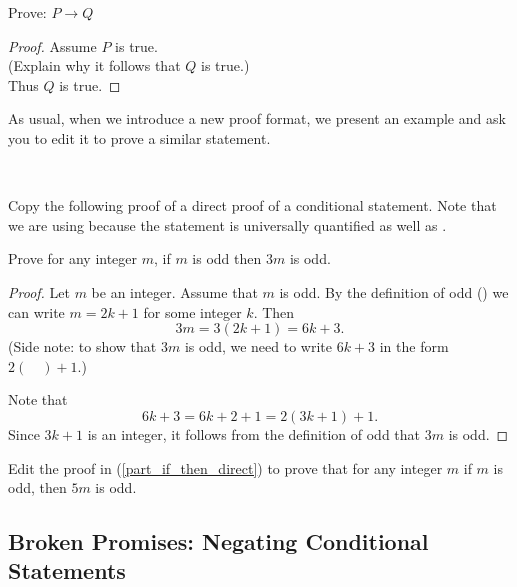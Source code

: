 \begin{pff}
\label{pff_if_then_direct} 
    Prove: $P \to Q$ 
    \begin{proof}
        Assume $P$ is true. \\
        (Explain why it follows that $Q$ is true.) \\
        Thus $Q$ is true.
    \end{proof}    
\end{pff}

As usual, when we introduce a new proof format, we present an example and ask you to edit it to prove a similar statement.

\begin{act}
\label{act_pffifthen}
~
    \begin{actpart}
        \item \label{part_if_then_direct} Copy the following proof of a direct proof of a conditional statement.  Note that we are using  because the statement is universally quantified as well as .

        Prove for any integer $m$, if $m$ is odd then $3m$ is odd.
            \begin{proof}
                Let $m$ be an integer.  Assume that $m$ is odd.  By the definition of odd () we can write $m=2k+1$ for some integer $k$.  Then     $$3m=3(2k+1)=6k+3.$$
                (Side note: to show that $3m$ is odd, we need to write $6k+3$ in the form $2(\quad)+1$.)
            
                Note that $$6k+3 = 6k+2+1 = 2(3k+1) + 1.$$
                Since $3k+1$ is an integer, it follows from the definition of odd that $3m$ is odd.
            \end{proof}

        \item Edit the proof in (\ref{part_if_then_direct}) to prove that for any integer $m$ if $m$ is odd, then $5m$ is odd.  
    \end{actpart}
\end{act}


 
\newcommand{\subnegcond}{Broken Promises: Negating Conditional Statements}
\subsection{\subnegcond}
\label{sub_neg_conditional}

